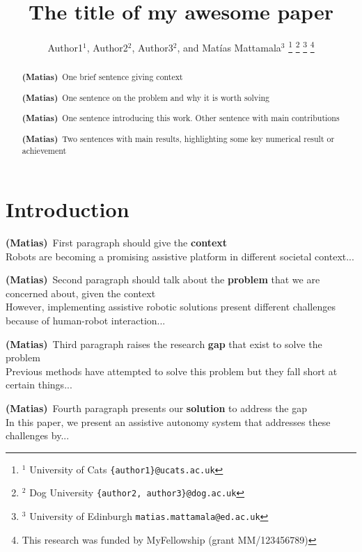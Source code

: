 \documentclass[letterpaper, 10 pt, conference]{ieeeconf}
\title{\LARGE \bf
The title of my awesome paper}
\author{Author1$^{1}$, Author2$^{2}$, Author3$^{2}$, and Mat{\'i}as Mattamala$^{3}$
%
\thanks{$^{1}$ University of Cats \texttt{\{author1\}@ucats.ac.uk}} %
\thanks{$^{2}$ Dog University \texttt{\{author2, author3\}@dog.ac.uk}} %
\thanks{$^{3}$ University of Edinburgh \texttt{matias.mattamala@ed.ac.uk}} %
\thanks{This research was funded by MyFellowship (grant MM/123456789)}
} %
\newcommand{\matias}[1]{\textcolor{RubineRed}{\textbf{(Matias)}~#1}}
\begin{document}
\maketitle
\thispagestyle{empty}
\pagestyle{empty}


\begin{abstract}
\matias{One brief sentence giving context}

\matias{One sentence on the problem and why it is worth solving}

\matias{One sentence introducing this work. Other sentence with main contributions}

\matias{Two sentences with main results, highlighting some key numerical result or achievement}

\textcolor{Gray}{\lipsum[1]}

\end{abstract}


\section{Introduction}

\matias{First paragraph should give the \textbf{context}}\\
Robots are becoming a promising assistive platform in different societal context...

\matias{Second paragraph should talk about the \textbf{problem} that we are concerned about, given the context}\\
However, implementing assistive robotic solutions present different challenges because of human-robot interaction...

\matias{Third paragraph raises the research \textbf{gap} that exist to solve the problem}\\
Previous methods have attempted to solve this problem but they fall short at certain things...

\matias{Fourth paragraph presents our \textbf{solution} to address the gap}\\
In this paper, we present an assistive autonomy system that addresses these challenges by...
\end{document}
